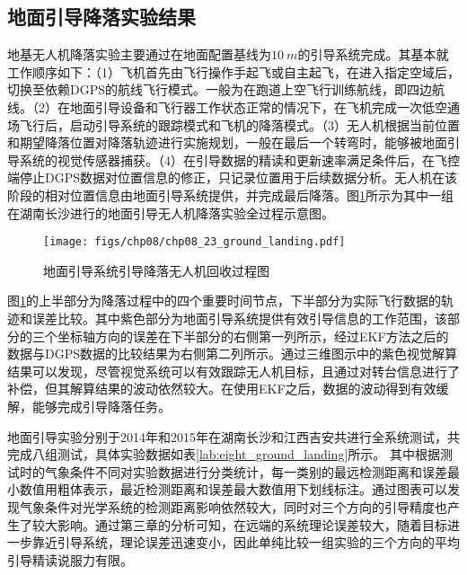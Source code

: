 \subsection{地面引导降落实验结果}
地基无人机降落实验主要通过在地面配置基线为$10\ m$的引导系统完成。其基本就工作顺序如下：（1）飞机首先由飞行操作手起飞或自主起飞，在进入指定空域后，切换至依赖DGPS的航线飞行模式。一般为在跑道上空飞行训练航线，即四边航线。（2）在地面引导设备和飞行器工作状态正常的情况下，在飞机完成一次低空通场飞行后，启动引导系统的跟踪模式和飞机的降落模式。（3）无人机根据当前位置和期望降落位置对降落轨迹进行实施规划，一般在最后一个转弯时，能够被地面引导系统的视觉传感器捕获。（4）在引导数据的精读和更新速率满足条件后，在飞控端停止DGPS数据对位置信息的修正，只记录位置用于后续数据分析。无人机在该阶段的相对位置信息由地面引导系统提供，并完成最后降落。图\ref{fig:chp08_23_ground_landing}所示为其中一组在湖南长沙进行的地面引导无人机降落实验全过程示意图。
\begin{figure}[!th]
	\centering
	\texttt{[image: figs/chp08/chp08\_23\_ground\_landing.pdf]}	
	\caption{地面引导系统引导降落无人机回收过程图}
	\label{fig:chp08_23_ground_landing}
\end{figure}

图\ref{fig:chp08_23_ground_landing}的上半部分为降落过程中的四个重要时间节点，下半部分为实际飞行数据的轨迹和误差比较。其中紫色部分为地面引导系统提供有效引导信息的工作范围，该部分的三个坐标轴方向的误差在下半部分的右侧第一列所示，经过EKF方法之后的数据与DGPS数据的比较结果为右侧第二列所示。通过三维图示中的紫色视觉解算结果可以发现，尽管视觉系统可以有效跟踪无人机目标，且通过对转台信息进行了补偿，但其解算结果的波动依然较大。在使用EKF之后，数据的波动得到有效缓解，能够完成引导降落任务。

地面引导实验分别于2014年和2015年在湖南长沙和江西吉安共进行全系统测试，共完成八组测试，具体实验数据如表\ref{lab:eight_ground_landing}所示。 其中根据测试时的气象条件不同对实验数据进行分类统计，每一类别的最远检测距离和误差最小数值用粗体表示，最近检测距离和误差最大数值用下划线标注。通过图表可以发现气象条件对光学系统的检测距离影响依然较大，同时对三个方向的引导精度也产生了较大影响。通过第三章的分析可知，在远端的系统理论误差较大，随着目标进一步靠近引导系统，理论误差迅速变小，因此单纯比较一组实验的三个方向的平均引导精读说服力有限。

